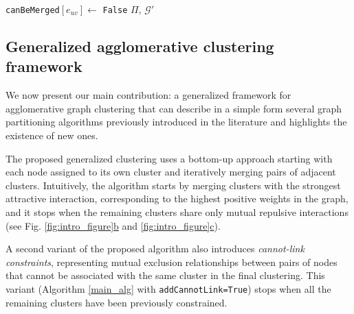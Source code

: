 \begin{algorithm}[t]
\begin{algorithmic}[1]
        \EndIf
          \State \texttt{canBeMerged}$[e_{uv}] \gets$ \texttt{False}
        \EndIf
      \EndWhile
      \State
      \Return $\Pi$, $\mathcal{G}'$



  \end{algorithmic}
  \label{main_alg}
\end{algorithm}


\subsection{Generalized agglomerative clustering framework} \label{sec:algorithm}

We now present our main contribution: a generalized framework for agglomerative graph clustering that can describe in a simple form several graph partitioning algorithms previously introduced in the literature and highlights the existence of new ones.

The proposed generalized clustering uses a bottom-up approach starting with each node assigned to its own cluster and iteratively merging pairs of adjacent clusters. Intuitively, the algorithm starts by merging clusters with the strongest attractive interaction, corresponding to the highest positive weights in the graph, and it stops when the remaining clusters share only mutual repulsive interactions (see Fig. \hyperref[fig:intro_figure]{\ref*{fig:intro_figure}b} and \hyperref[fig:intro_figure]{\ref*{fig:intro_figure}c}). 

A second variant of the proposed algorithm also introduces \emph{cannot-link constraints}, representing mutual exclusion relationships between pairs of nodes that cannot be associated with the same cluster in the final clustering. This variant (Algorithm \ref{main_alg} with \texttt{addCannotLink=True}) stops when all the remaining clusters have been previously constrained.


